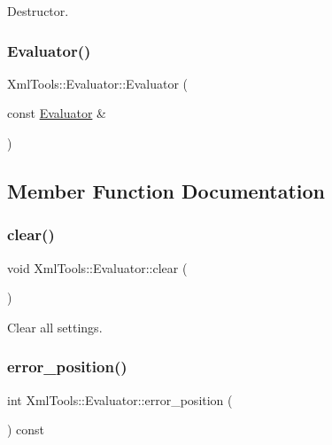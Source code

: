 Destructor. \hypertarget{class_xml_tools_1_1_evaluator_a3b212d7fe6e68a9f398daebc2968ebfe}{}\label{class_xml_tools_1_1_evaluator_a3b212d7fe6e68a9f398daebc2968ebfe} 
\subsubsection{\texorpdfstring{Evaluator()}{Evaluator()}\hspace{0.1cm}{\footnotesize\ttfamily [2/2]}}
{\footnotesize\ttfamily Xml\+Tools\+::\+Evaluator\+::\+Evaluator (\begin{DoxyParamCaption}\item[{const \hyperlink{class_xml_tools_1_1_evaluator}{Evaluator} \&}]{ }\end{DoxyParamCaption})\hspace{0.3cm}{\ttfamily [private]}}



\subsection{Member Function Documentation}
\hypertarget{class_xml_tools_1_1_evaluator_ab54a35f068996b3c402c575f3aea242f}{}\label{class_xml_tools_1_1_evaluator_ab54a35f068996b3c402c575f3aea242f} 
\subsubsection{\texorpdfstring{clear()}{clear()}}
{\footnotesize\ttfamily void Xml\+Tools\+::\+Evaluator\+::clear (\begin{DoxyParamCaption}{ }\end{DoxyParamCaption})}

Clear all settings. \hypertarget{class_xml_tools_1_1_evaluator_a2df5fb8050eeabce30ea87b8e211612a}{}\label{class_xml_tools_1_1_evaluator_a2df5fb8050eeabce30ea87b8e211612a} 
\subsubsection{\texorpdfstring{error\+\_\+position()}{error\_position()}}
{\footnotesize\ttfamily int Xml\+Tools\+::\+Evaluator\+::error\+\_\+position (\begin{DoxyParamCaption}{ }\end{DoxyParamCaption}) const}

